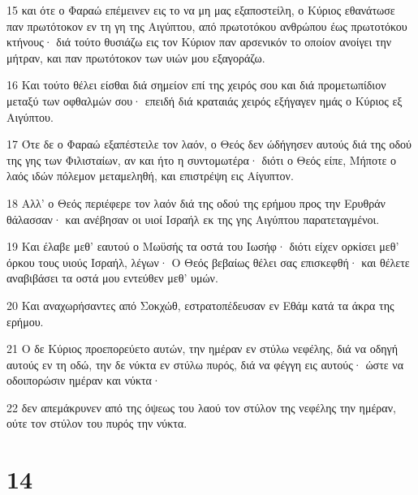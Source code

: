 \par 15 και ότε ο Φαραώ επέμεινεν εις το να μη μας εξαποστείλη, ο Κύριος εθανάτωσε παν πρωτότοκον εν τη γη της Αιγύπτου, από πρωτοτόκου ανθρώπου έως πρωτοτόκου κτήνους· διά τούτο θυσιάζω εις τον Κύριον παν αρσενικόν το οποίον ανοίγει την μήτραν, και παν πρωτότοκον των υιών μου εξαγοράζω.
\par 16 Και τούτο θέλει είσθαι διά σημείον επί της χειρός σου και διά προμετωπίδιον μεταξύ των οφθαλμών σου· επειδή διά κραταιάς χειρός εξήγαγεν ημάς ο Κύριος εξ Αιγύπτου.
\par 17 Ότε δε ο Φαραώ εξαπέστειλε τον λαόν, ο Θεός δεν ώδήγησεν αυτούς διά της οδού της γης των Φιλισταίων, αν και ήτο η συντομωτέρα· διότι ο Θεός είπε, Μήποτε ο λαός ιδών πόλεμον μεταμεληθή, και επιστρέψη εις Αίγυπτον.
\par 18 Αλλ' ο Θεός περιέφερε τον λαόν διά της οδού της ερήμου προς την Ερυθράν θάλασσαν· και ανέβησαν οι υιοί Ισραήλ εκ της γης Αιγύπτου παρατεταγμένοι.
\par 19 Και έλαβε μεθ' εαυτού ο Μωϋσής τα οστά του Ιωσήφ· διότι είχεν ορκίσει μεθ' όρκου τους υιούς Ισραήλ, λέγων· Ο Θεός βεβαίως θέλει σας επισκεφθή· και θέλετε αναβιβάσει τα οστά μου εντεύθεν μεθ' υμών.
\par 20 Και αναχωρήσαντες από Σοκχώθ, εστρατοπέδευσαν εν Εθάμ κατά τα άκρα της ερήμου.
\par 21 Ο δε Κύριος προεπορεύετο αυτών, την ημέραν εν στύλω νεφέλης, διά να οδηγή αυτούς εν τη οδώ, την δε νύκτα εν στύλω πυρός, διά να φέγγη εις αυτούς· ώστε να οδοιπορώσιν ημέραν και νύκτα·
\par 22 δεν απεμάκρυνεν από της όψεως του λαού τον στύλον της νεφέλης την ημέραν, ούτε τον στύλον του πυρός την νύκτα.

\chapter{14}

